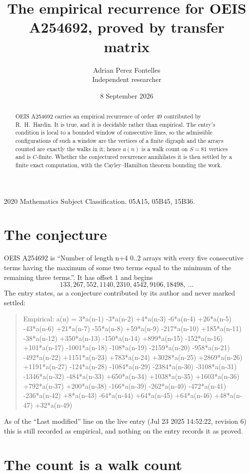 \documentclass[11pt,a4paper]{article}
\title{The empirical recurrence for OEIS A254692, proved by transfer matrix}
\author{Adrian Perez Fontelles\\ \small Independent researcher}
\date{8 September 2026}
\theoremstyle{plain}
\theoremstyle{definition}
\begin{document}
\maketitle

\begin{abstract}
OEIS A254692 carries an empirical recurrence of order $49$ contributed by R.~H.~Hardin. It is
true, and it is decidable rather than empirical. The entry's condition is local to a bounded window of consecutive lines, so
the admissible configurations of such a window are the vertices of a finite digraph and the
arrays counted are exactly the walks in it; hence $a(n)$ is a walk count on $S=81$ vertices
and is $C$-finite. Whether the conjectured recurrence annihilates it is then settled by a
finite exact computation, with the Cayley--Hamilton theorem bounding the work.
\end{abstract}

\noindent\small 2020 Mathematics Subject Classification. 05A15, 05B45, 15B36.\normalsize

\section{The conjecture}

OEIS A254692 is ``Number of length n+4 0..2 arrays with every five consecutive terms having the maximum of some two terms equal to the minimum of the remaining three terms.''. It has offset $1$ and begins
\[
133, 267, 552, 1140, 2310, 4542, 9106, 18498,\ \dots
\]
The entry states, as a conjecture contributed by its author and never marked settled:
\begin{quote}
Empirical: a(n) = 3*a(n-1) -3*a(n-2) +4*a(n-3) -6*a(n-4) +26*a(n-5) -43*a(n-6) +21*a(n-7) -55*a(n-8) +59*a(n-9) -217*a(n-10) +185*a(n-11) -38*a(n-12) +350*a(n-13) -150*a(n-14) +899*a(n-15) -152*a(n-16) +101*a(n-17) -1001*a(n-18) -108*a(n-19) -2159*a(n-20) -958*a(n-21) -492*a(n-22) +1151*a(n-23) +783*a(n-24) +3028*a(n-25) +2869*a(n-26) +1191*a(n-27) -124*a(n-28) -1084*a(n-29) -2384*a(n-30) -3108*a(n-31) -1346*a(n-32) -484*a(n-33) +650*a(n-34) +1038*a(n-35) +1603*a(n-36) +792*a(n-37) +200*a(n-38) -166*a(n-39) -262*a(n-40) -472*a(n-41) -236*a(n-42) +8*a(n-43) -64*a(n-44) +64*a(n-45) +64*a(n-46) +48*a(n-47) +32*a(n-49)
\end{quote}
As of the ``Last modified'' line on the live entry (Jul 23 2025 14:52:22, revision 6) this is still
recorded as empirical, and nothing on the entry records it as proved.

\section{The count is a walk count}
\end{document}
